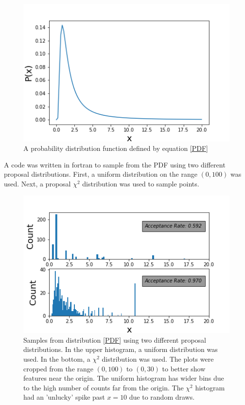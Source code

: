 \documentclass[twocolumn]{article}
\begin{document}
\begin{figure}
\centering
\includegraphics[width=\linewidth]{PDF}
\caption{A probability distribution function defined by equation \ref{PDF}}
\label{fig:PDF}
\end{figure}


A code was written in fortran to sample from the PDF using two different proposal distributions. First, a uniform distribution on the range $(0,100)$ was used. Next, a proposal $\chi^2$ distribution was used to sample points.

\begin{figure}
\centering
\includegraphics[width=\linewidth]{mixed_chains}
\caption{Samples from distribution \ref{PDF} using two different proposal distributions. In the upper histogram, a uniform distribution was used. In the bottom, a $\chi^2$ distribution was used. The plots were cropped from the range $(0,100)$ to $(0,30)$ to better show features near the origin. The uniform histogram has wider bins due to the high number of counts far from the origin. The $\chi^2$ histogram had an 'unlucky' spike past $x=10$ due to random draws.}
\label{fig:mixed_chains}
\end{figure}
 
\end{document}
